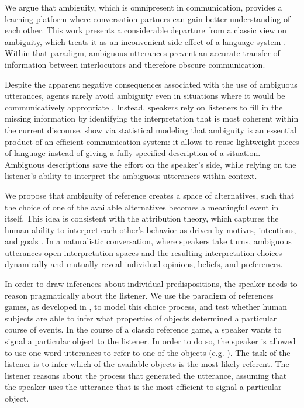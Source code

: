 \documentclass[10pt,a4paper]{article}
\begin{document}
We argue that ambiguity, which is omnipresent in communication, provides a learning platform where conversation partners can gain better understanding of each other.
This work presents a considerable departure from a classic view on ambiguity, which treats it as an inconvenient side effect of a language system \cite{grice1975,chomsky2002minimalism}.
Within that paradigm, ambiguous utterances prevent an accurate transfer of information between interlocutors and therefore obscure communication. 

Despite the apparent negative consequences associated with the use of ambiguous utterances, agents rarely avoid ambiguity even in situations where it would be communicatively appropriate \cite{wasow2015, ferreira2008}. Instead, speakers rely on listeners to fill in the missing information by identifying the interpretation that is most coherent within the current discourse.
 show via statistical modeling that ambiguity is an essential product of an efficient communication system: it allows to reuse lightweight pieces of language instead of giving a fully specified description of a situation. Ambiguous descriptions save the effort on the speaker's side, while relying on the listener's ability to interpret the ambiguous utterances within context.

We propose that ambiguity of reference creates a space of alternatives, such that the choice of one of the available alternatives becomes a meaningful event in itself.
This idea is consistent with the attribution theory, which captures the human ability to interpret each other's behavior as driven by motives, intentions, and goals \cite{jones1965acts, kelley1967attribution, kelley1970social}.
In a naturalistic conversation, where speakers take turns, ambiguous utterances open interpretation spaces and the resulting interpretation choices dynamically and mutually reveal individual opinions, beliefs, and preferences. 
 
In order to draw inferences about individual predispositions, the speaker needs to reason pragmatically about the listener.
We use the paradigm of references games, as developed in , to model this choice process, and test whether human subjects are able to infer what properties of objects determined a particular course of events. In the course of a classic reference game, a speaker wants to signal a particular object to the listener. In order to do so, the speaker is allowed to use one-word utterances to refer to one of the objects (e.g. ).
The task of the listener is to infer which of the available objects is the most likely referent.
The listener reasons about the process that generated the utterance, assuming that the speaker uses the utterance that is the most efficient to signal a particular object. 
\end{document}
